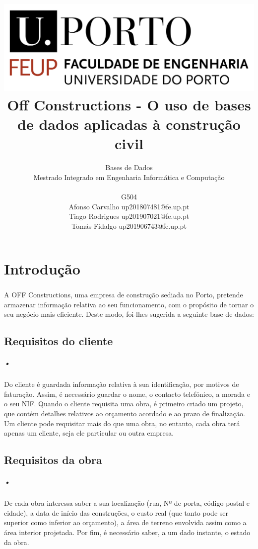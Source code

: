 \documentclass{report}
\title{ \includegraphics[scale=0.3]{logo.png} \\ \textbf{Off Constructions - O uso de bases de dados aplicadas à construção civil}}
\author{Bases de Dados \\ Mestrado Integrado em Engenharia Informática e Computação \\ \\ G504 \\ Afonso Carvalho up201807481@fe.up.pt \\ Tiago Rodrigues up201907021@fe.up.pt \\ Tomás Fidalgo up201906743@fe.up.pt}
\begin{document}
	\maketitle
	
	\tableofcontents
	
	\chapter{Introdução}
		\paragraph{}A OFF Constructions, uma empresa de construção sediada no Porto, pretende
		armazenar informação relativa ao seu funcionamento, com o propósito de tornar o seu
		negócio mais eficiente. Deste modo, foi-lhes sugerida a seguinte base de dados:
		
		\section{Requisitos do cliente}
		
			\paragraph{•}Do cliente é guardada informação relativa à sua identificação, por
			motivos de faturação. Assim, é necessário guardar o nome, o contacto telefónico, a
			morada e o seu NIF. Quando o cliente requisita uma obra, é primeiro criado um
			projeto, que contém detalhes relativos ao orçamento acordado e ao prazo de
			finalização. Um cliente pode requisitar mais do que uma obra, no entanto, cada
			obra terá apenas um cliente, seja ele particular ou outra empresa.
		
		\section{Requisitos da obra}
		
			\paragraph{•}De cada obra interessa saber a sua localização (rua, Nº de porta,
			código postal e cidade), a data de início das construções, o custo real (que tanto
			pode ser superior como inferior ao orçamento), a área de terreno envolvida assim
			como a área interior projetada. Por fim, é necessário saber, a um dado instante, o
			estado da obra.
			
\end{document}

